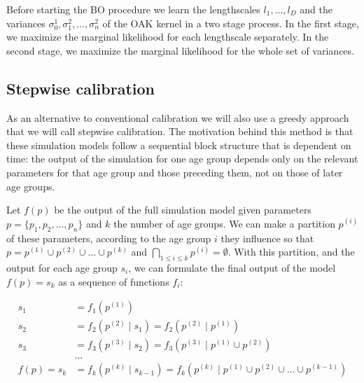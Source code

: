 \documentclass{IOS-Book-Article}
\begin{document}
Before starting the BO procedure we learn the lengthscales $l_1, ..., l_D$ and the variances $\sigma_0^1, \sigma_1^2, ..., \sigma_n^2$ of the OAK kernel in a two stage process. In the first stage, we maximize the marginal likelihood for each lengthscale separately. In the second stage, we maximize the marginal likelihood for the whole set of variances.
 	
 	\subsection{Stepwise calibration}

As an alternative to conventional calibration we will also use a greedy approach that we will call stepwise calibration. The motivation behind this method is that these simulation models follow a sequential block structure that is dependent on time: the output of the simulation for one age group depends only on the relevant parameters for that age group and those preceding them, not on those of later age groups.

Let $f(p)$ be the output of the full simulation model given parameters $p = \{p_1, p_2, ..., p_n\}$ and $k$ the number of age groups. We can make a partition $p^{(i)}$ of these parameters, according to the age group $i$ they influence so that $p = p^{(1)} \cup p^{(2)} \cup ... \cup p^{(k)}$ and $\underset{1\leq i \leq k}{\bigcap} p^{(i)} = \emptyset$. With this partition, and the output for each age group $s_i$, we can formulate the final output of the model $f(p) = s_k$ as a sequence of functions $f_i$:
 	
 	\begin{equation} \label{eq:stepwise-function}
 		\begin{aligned}
 			s_1 &= f_1(p^{(1)})  \\
 			s_2 &= f_2(p^{(2)} \mid s_1)= f_2(p^{(2)} \mid p^{(1)}) \\
 			s_3 &= f_3(p^{(3)} \mid s_2)= f_3(p^{(3)} \mid p^{(1)} \cup p^{(2)}) \\
 			&\dots \\
 			f(p) = s_k &= f_k(p^{(k)} \mid s_{k-1})= f_k(p^{(k)} \mid p^{(1)} \cup p^{(2)} \cup \dots \cup p^{(k-1)}) \\
 		\end{aligned}
 	\end{equation}	
\end{document}
